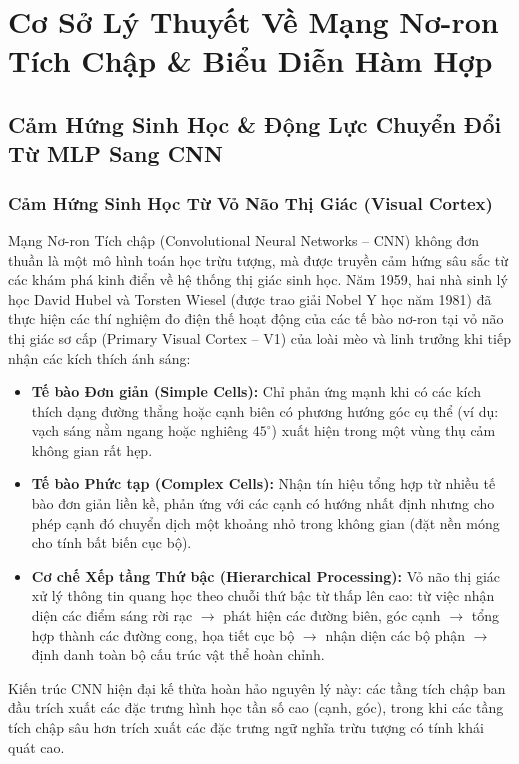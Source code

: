\documentclass[12pt,a4paper]{report}
\begin{document}
\newpage

\chapter{Cơ Sở Lý Thuyết Về Mạng Nơ-ron Tích Chập \& Biểu Diễn Hàm Hợp}

\section{Cảm Hứng Sinh Học \& Động Lực Chuyển Đổi Từ MLP Sang CNN}

\subsection{Cảm Hứng Sinh Học Từ Vỏ Não Thị Giác (Visual Cortex)}
Mạng Nơ-ron Tích chập (Convolutional Neural Networks -- CNN) không đơn thuần là một mô hình toán học trừu tượng, mà được truyền cảm hứng sâu sắc từ các khám phá kinh điển về hệ thống thị giác sinh học. Năm 1959, hai nhà sinh lý học David Hubel và Torsten Wiesel (được trao giải Nobel Y học năm 1981) đã thực hiện các thí nghiệm đo điện thế hoạt động của các tế bào nơ-ron tại vỏ não thị giác sơ cấp (Primary Visual Cortex -- V1) của loài mèo và linh trưởng khi tiếp nhận các kích thích ánh sáng:
\begin{itemize}[leftmargin=2em]
    \item \textbf{Tế bào Đơn giản (Simple Cells):} Chỉ phản ứng mạnh khi có các kích thích dạng đường thẳng hoặc cạnh biên có phương hướng góc cụ thể (ví dụ: vạch sáng nằm ngang hoặc nghiêng $45^\circ$) xuất hiện trong một vùng thụ cảm không gian rất hẹp.
    \item \textbf{Tế bào Phức tạp (Complex Cells):} Nhận tín hiệu tổng hợp từ nhiều tế bào đơn giản liền kề, phản ứng với các cạnh có hướng nhất định nhưng cho phép cạnh đó chuyển dịch một khoảng nhỏ trong không gian (đặt nền móng cho tính bất biến cục bộ).
    \item \textbf{Cơ chế Xếp tầng Thứ bậc (Hierarchical Processing):} Vỏ não thị giác xử lý thông tin quang học theo chuỗi thứ bậc từ thấp lên cao: từ việc nhận diện các điểm sáng rời rạc $\to$ phát hiện các đường biên, góc cạnh $\to$ tổng hợp thành các đường cong, họa tiết cục bộ $\to$ nhận diện các bộ phận $\to$ định danh toàn bộ cấu trúc vật thể hoàn chỉnh.
\end{itemize}
Kiến trúc CNN hiện đại kế thừa hoàn hảo nguyên lý này: các tầng tích chập ban đầu trích xuất các đặc trưng hình học tần số cao (cạnh, góc), trong khi các tầng tích chập sâu hơn trích xuất các đặc trưng ngữ nghĩa trừu tượng có tính khái quát cao.
\end{document}
